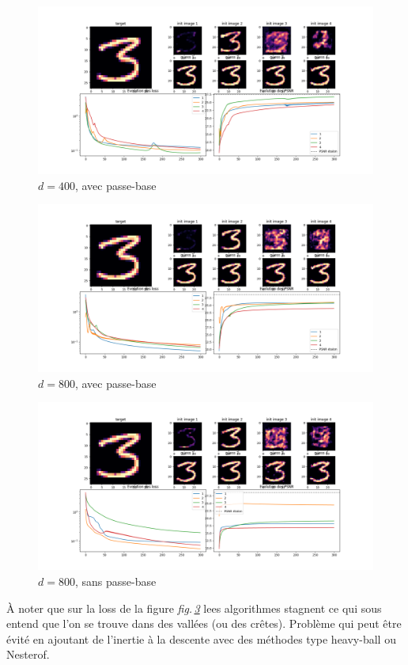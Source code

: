 \documentclass[hidelinks, french]{article} %
\newcommand{\figref}[1]{\textit{fig.\,\ref{#1}}}
\theoremstyle{enonce}
\theoremstyle{special}
\theoremstyle{rq}
\theoremstyle{exo}
\theoremstyle{demo}
\begin{document}
\begin{figure}[H]\centering
	\includegraphics[width=1\textwidth]{../resultats/LGD/differents latents/lat-g_400_fig.png}
	\caption{$d=400$, avec passe-base}
	\label{fig:LGD comp_size g}
\end{figure}

\begin{figure}[H]\centering
	\includegraphics[width=1\textwidth]{../resultats/LGD/differents latents/lat-g_800_fig.png}
	\caption{$d=800$, avec passe-base}
	\label{fig:LGD comp_size g}
\end{figure}

\begin{figure}[H]\centering
\includegraphics[width=1\textwidth]{../resultats/LGD/differents latents/lat-s_800_fig.png}
\caption{$d=800$, sans passe-base}
\label{fig:LGD comp_size g}
\end{figure}
\`A noter que sur la loss de la figure \figref{fig:LGD comp_size g} lees algorithmes stagnent ce qui sous entend que l'on se trouve dans des vallées (ou des crêtes). Problème qui peut être évité en ajoutant de l'inertie à la descente avec des méthodes type heavy-ball ou Nesterof. 
\end{document}
